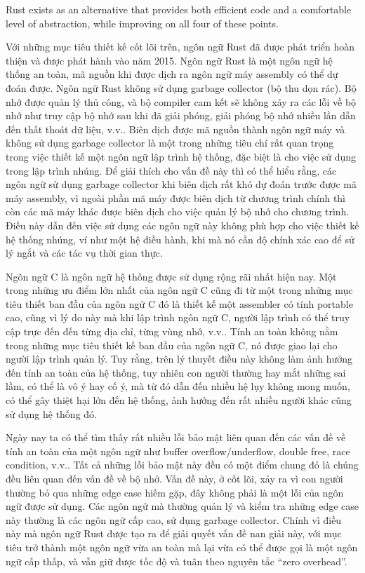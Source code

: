 Rust exists as an alternative that provides both efficient code and a comfortable level of abstraction, while improving on all four of these points.

\bigskip

Với những mục tiêu thiết kế cốt lõi trên, ngôn ngữ Rust đã được phát triển hoàn thiện và được phát hành vào năm 2015.
Ngôn ngữ Rust là một ngôn ngữ hệ thống an toàn, mã nguồn khi được dịch ra ngôn ngữ máy assembly có thể dự đoán được.
Ngôn ngữ Rust không sử dụng garbage collector (bộ thu dọn rác). Bộ nhớ được quản lý thủ công, và bộ compiler cam kết sẽ không xảy ra các lỗi về bộ nhớ như truy cập bộ nhớ sau khi đã giải phóng, giải phóng bộ nhớ nhiều lần dẫn đến thất thoát dữ liệu, v.v.. \cite{phd_safe_type}
Biên dịch được mã nguồn thành ngôn ngữ máy và không sử dụng garbage collector là một trong những tiêu chí rất quan trọng trong việc thiết kế một ngôn ngữ lập trình hệ thống, đặc biệt là cho việc sử dụng trong lập trình nhúng.
Để giải thích cho vấn đề này thì có thể hiểu rằng, các ngôn ngữ sử dụng garbage collector khi biên dịch rất khó dự đoán trước được mã máy assembly, vì ngoài phần mã máy được biên dịch từ chương trình chính thì còn các mã máy khác được biên dịch cho việc quản lý bộ nhớ cho chương trình.
Điều này dẫn đến việc sử dụng các ngôn ngữ này không phù hợp cho việc thiết kế hệ thống nhúng, ví như một hệ điều hành, khi mà nó cần độ chính xác cao để sử lý ngắt và các tác vụ thời gian thực. \cite{rust_embedded_c}

Ngôn ngữ C là ngôn ngữ hệ thống được sử dụng rộng rãi nhất hiện nay. Một trong những ưu điểm lớn nhất của ngôn ngữ C cũng đi từ một trong những mục tiêu thiết ban đầu của ngôn ngữ C đó là thiết kế một assembler có tính portable cao, cũng vì lý do này mà khi lập trình ngôn ngữ C, người lập trình có thể truy cập trực đến đến từng địa chỉ, từng vùng nhớ, v.v.. Tính an toàn không nằm trong những mục tiêu thiết kế ban đầu của ngôn ngữ C, nó được giao lại cho người lập trình quản lý. Tuy rằng, trên lý thuyết điều này không làm ảnh hưởng đến tính an toàn của hệ thống, tuy nhiên con người thường hay mắt những sai lầm, có thể là vô ý hay cố ý, mà từ đó dẫn đến nhiều hệ lụy không mong muốn, có thể gây thiệt hại lớn đến hệ thống, ảnh hưởng đến rất nhiều người khác cũng sử dụng hệ thống đó. \cite{ms_70}

Ngày nay ta có thể tìm thấy rất nhiều lỗi bảo mật liên quan đến các vấn đề về tính an toàn của một ngôn ngữ như buffer overflow/underflow, double free, race condition, v.v.. Tất cả những lỗi bảo mật này đều có một điểm chung đó là chúng đều liên quan đến vấn đề về bộ nhớ. Vấn đề này, ở cốt lõi, xảy ra vì con người thường bỏ qua những edge case hiếm gặp, đây không phải là một lỗi của ngôn ngữ được sử dụng. Các ngôn ngữ mà thường quản lý và kiểm tra những edge case này thường là các ngôn ngữ cấp cao, sử dụng garbage collector. Chính vì điều này mà ngôn ngữ Rust được tạo ra để giải quyết vấn đề nan giải này, với mục tiêu trở thành một ngôn ngữ vừa an toàn mà lại vừa có thể được gọi là một ngôn ngữ cấp thấp, và vẫn giữ được tốc độ và tuân theo nguyên tắc ``zero overhead''.

